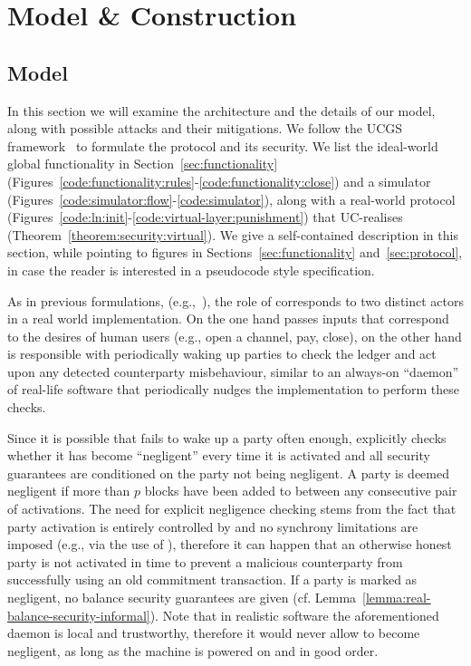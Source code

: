\section{Model \& Construction}
\label{sec:construction}
  \subsection{Model}
  In this section we will examine the architecture and the details of our model,
  along with possible attacks and their mitigations. We follow the UCGS
  framework~\cite{DBLP:conf/tcc/BadertscherCHTZ20} to formulate the protocol and
  its security. We list the
  ideal-world global functionality \fchan in Section~\ref{sec:functionality}
  (Figures~\ref{code:functionality:rules}-\ref{code:functionality:close}) and a
  simulator \simulator (Figures~\ref{code:simulator:flow}-\ref{code:simulator}),
  along with a real-world protocol \pchan
  (Figures~\ref{code:ln:init}-\ref{code:virtual-layer:punishment}) that
  UC-realises \fchan (Theorem~\ref{theorem:security:virtual}). We give a
  self-contained description in this section, while pointing to figures in
  Sections~\ref{sec:functionality} and~\ref{sec:protocol}, in case the reader is
  interested in a pseudocode style specification.

  As in previous formulations, (e.g.,~\cite{DBLP:conf/csfw/KiayiasL20}), the
  role of \environment corresponds to two distinct actors in a real world
  implementation. On the one hand \environment passes inputs that correspond to
  the desires of human users (e.g., open a channel, pay, close), on the other hand
  \environment is responsible with periodically waking up parties to check the
  ledger and act upon any detected counterparty misbehaviour, similar to an
  always-on ``daemon'' of real-life software that periodically nudges the
  implementation to perform these checks.

  Since it is possible that \environment fails to wake up a party often enough,
  \pchan explicitly checks whether it has become ``negligent'' every time it is
  activated and all security guarantees are conditioned on the party not being
  negligent. A party is deemed negligent if more than $p$ blocks have been added
  to \ledger between any consecutive pair of activations. The need for explicit
  negligence checking stems from the fact that party activation is entirely
  controlled by \environment and no synchrony limitations are imposed (e.g., via
  the use of \Fclock), therefore it can happen that an otherwise honest party is
  not activated in time to prevent a malicious counterparty from successfully
  using an old commitment transaction. If a party is marked as negligent, no
  balance security guarantees are given (cf.
  Lemma~\ref{lemma:real-balance-security-informal}). Note that in realistic
  software the aforementioned daemon is local and trustworthy, therefore it
  would never allow \pchan to become negligent, as long as the machine is
  powered on and in good order.

